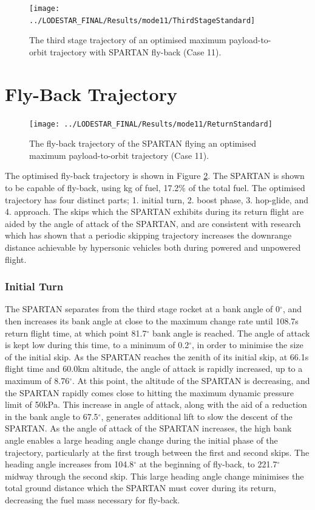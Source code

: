 \begin{figure}[ht!]
\centering
\texttt{[image: ../LODESTAR\_FINAL/Results/mode11/ThirdStageStandard]}
\caption{The third stage trajectory of an optimised maximum payload-to-orbit trajectory with SPARTAN fly-back (Case 11). }
\label{fig:ThirdStageStandard}
\end{figure}


\section{Fly-Back Trajectory}

\begin{figure}[ht!]
	\centering
	\texttt{[image: ../LODESTAR\_FINAL/Results/mode11/ReturnStandard]}
	\caption{The fly-back trajectory of the SPARTAN flying an optimised maximum payload-to-orbit trajectory (Case 11). }
	\label{fig:ReturnStandard}
\end{figure}

The optimised fly-back trajectory is shown in Figure \ref{fig:ReturnStandard}.
The SPARTAN is shown to be capable of fly-back, using \returnFuelStandard kg of fuel, 17.2\% of the total fuel.
The optimised trajectory has four distinct parts; 1. initial turn, 2. boost phase, 3. hop-glide, and 4. approach. 
 The skips which the SPARTAN exhibits during its return flight are aided by the angle of attack of the SPARTAN, and are consistent with research which has shown that a periodic skipping trajectory increases the downrange distance achievable by hypersonic vehicles both during powered and unpowered flight\cite{Eggers1957,Kanda2007}. 
 
\subsubsection{ Initial Turn}
The SPARTAN separates from the third stage rocket at a bank angle of 0$^\circ$, and then increases its bank angle at close to the maximum change rate until 108.7s return flight time, at which point 81.7$^\circ$ bank angle is reached.
The angle of attack is kept low during this time, to a minimum of 0.2$^\circ$, in order to minimise the size of the initial skip. 
As the SPARTAN reaches the zenith of its initial skip, at 66.1s flight time and 60.0km altitude, the angle of attack is rapidly increased, up to a maximum of 8.76$^\circ$. 
 At this point, the altitude of the SPARTAN is decreasing, and the SPARTAN rapidly comes close to hitting the maximum dynamic pressure limit of 50kPa. This increase in angle of attack, along with the aid of a reduction in the bank angle to 67.5$^\circ$, generates additional lift to slow the descent of the SPARTAN. 
As the angle of attack of the SPARTAN increases, the high bank angle enables a large heading angle change during the initial phase of the trajectory, particularly at the first trough between the first and second skips. The heading angle increases from 104.8$^\circ$ at the beginning of fly-back, to 221.7$^\circ$ midway through the second skip. This large heading angle change minimises the total ground distance which the SPARTAN must cover during its return, decreasing the fuel mass necessary for fly-back. 

